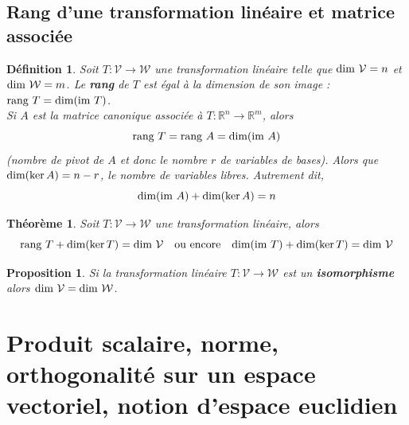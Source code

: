 \documentclass{article}[french, babel]
\newtheorem{mydef}{Définition}
\newtheorem{myprop}{Proposition}
\newtheorem{mythm}{Théorème}
\let\stdsection\section
\renewcommand\section{\newpage\stdsection}
\begin{document}
	\subsection{Rang d'une transformation linéaire et matrice associée}
		\begin{mydef}
			Soit $T:\mathcal{V}\longrightarrow\mathcal{W}$ une transformation linéaire telle que $\text{\normalfont{dim}}\ \mathcal{V}=n$ et $\text{\normalfont{dim}}\ \mathcal{W}=m$. Le \textbf{rang} de $T$ est égal à la dimension de son image : $\text{\normalfont{rang}}\ T=\text{\normalfont{dim}}(\text{\normalfont{im}}\ T)$.\\
			Si $A$ est la matrice canonique associée à $T:\mathbb{R}^n \longrightarrow\mathbb{R}^m$, alors $$\text{\normalfont{rang}}\ T=\text{\normalfont{rang}}\ A = \text{\normalfont{dim}}(\text{\normalfont{im}}\ A)$$ (nombre de pivot de $A$ et donc le nombre $r$ de variables de bases). Alors que $\text{\normalfont{dim}}(\ker A)=n-r$, le nombre de variables libres. Autrement dit, $$\text{\normalfont{dim}}(\text{\normalfont{im}}\ A) + \text{\normalfont{dim}}(\ker A)=n$$
		\end{mydef}
		\begin{mythm}
			Soit $T : \mathcal{V}\longrightarrow\mathcal{W}$ une transformation linéaire, alors
			\[\text{\normalfont{rang}}\ T+\text{\normalfont{dim}}(\ker T)=\text{\normalfont{dim}}\ \mathcal{V}\quad\text{ou encore}\quad\text{\normalfont{dim}}(\text{\normalfont{im}}\ T)+\text{\normalfont{dim}}(\ker T)=\text{\normalfont{dim}}\ \mathcal{V}\]
		\end{mythm}
		\begin{myprop}
			Si la transformation linéaire $T : \mathcal{V}\longrightarrow\mathcal{W}$ est un \textbf{isomorphisme} alors $\text{\normalfont{dim}}\ \mathcal{V}=\text{\normalfont{dim}}\ \mathcal{W}$.
		\end{myprop}
\section{Produit scalaire, norme, orthogonalité sur un espace vectoriel, notion d'espace euclidien}
\end{document}
